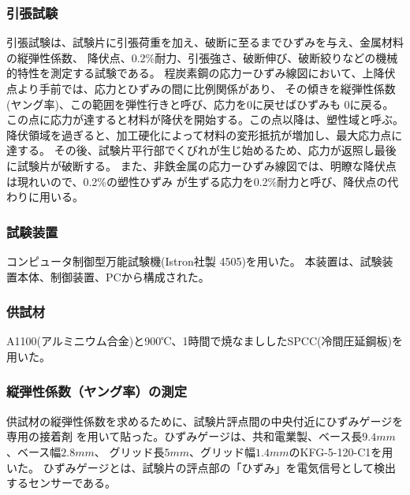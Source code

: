\documentclass[10pt,a4j]{jsarticle}
\begin{document}
  \subsubsection{引張試験}
  引張試験は、試験片に引張荷重を加え、破断に至るまでひずみを与え、金属材料の縦弾性係数、
  降伏点、0.2\%耐力、引張強さ、破断伸び、破断絞りなどの機械的特性を測定する試験である。
  程炭素鋼の応力ーひずみ線図において、上降伏点より手前では、応力とひずみの間に比例関係があり、
  その傾きを縦弾性係数(ヤング率)、この範囲を弾性行きと呼び、応力を$0$に戻せばひずみも
  $0$に戻る。この点に応力が達すると材料が降伏を開始する。この点以降は、塑性域と呼ぶ。
  降伏領域を過ぎると、加工硬化によって材料の変形抵抗が増加し、最大応力点に達する。
  その後、試験片平行部でくびれが生じ始めるため、応力が返照し最後に試験片が破断する。
  また、非鉄金属の応力ーひずみ線図では、明瞭な降伏点は現れいので、0.2\%の塑性ひずみ
  が生ずる応力を0.2\%耐力と呼び、降伏点の代わりに用いる。
  \subsubsection{試験装置}
  コンピュータ制御型万能試験機(Istron社製 4505)を用いた。
  本装置は、試験装置本体、制御装置、PCから構成された。
  \subsubsection{供試材}
  A1100(アルミニウム合金)と900℃、1時間で焼なまししたSPCC(冷間圧延鋼板)を用いた。
  \subsubsection{縦弾性係数（ヤング率）の測定}
  供試材の縦弾性係数を求めるために、試験片評点間の中央付近にひずみゲージを専用の接着剤
  を用いて貼った。ひずみゲージは、共和電業製、ベース長$9.4mm$、ベース幅$2.8mm$、
  グリッド長$5mm$、グリッド幅$1.4mm$のKFG-5-120-C1を用いた。
  ひずみゲージとは、試験片の評点部の「ひずみ」を電気信号として検出するセンサーである。
\end{document}
